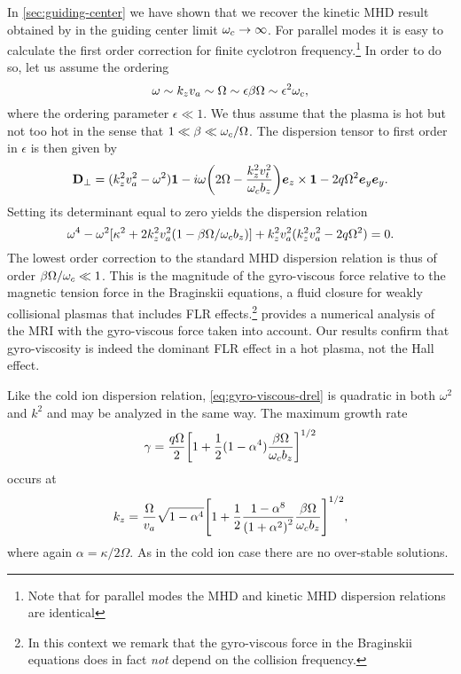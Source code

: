 \documentclass[aps,pre,notitlepage,amsmath,amssymb,amsfonts,nobibnotes,nofootinbib]{revtex4-1}
\begin{document}
In \cref{sec:guiding-center} we have shown that we recover the kinetic MHD
result obtained by \citet{Quataert2002} in the guiding center limit
$\omega_c\to\infty$. For parallel modes it is easy to calculate the first order
correction for finite cyclotron frequency.\footnote{Note that for parallel
  modes the MHD and kinetic MHD dispersion relations are identical} In order
to do so, let us assume the ordering
\begin{equation}
  \label{eq:ordering}
  \omega\sim k_z\va\sim\Omega\sim\epsilon\beta\Omega
  \sim\epsilon^2\omc,
\end{equation}
where the ordering parameter $\epsilon\ll1$. We thus assume that the plasma is
hot but not too hot in the sense that $1\ll\beta\ll\omega_c/\Omega$. The
dispersion tensor to first order in $\epsilon$ is then given by
\begin{equation}
  \label{eq:gyro-viscous-drel}
  \mathbf{D}_\perp = (k_z^2\va^2 - \omega^2)\mathbf{1} - i\omega\left(
    2\Omega - \frac{k_z^2\vt^2}{\omc b_z}
  \right)\ez\times\mathbf{1} - 2q\Omega^2\ey\ey.
\end{equation}
Setting its determinant equal to zero yields the dispersion relation
\begin{equation}
  \omega^4
  - \omega^2[\kappa^2 + 2k_z^2\va^2\left(1 - \beta\Omega/\omc b_z\right)]
  + k_z^2\va^2(k_z^2\va^2 - 2q\Omega^2) = 0.
\end{equation}
The lowest order correction to the standard MHD dispersion relation is thus of
order $\beta\Omega/\omega_c\ll{}1$. This is the magnitude of the gyro-viscous
force relative to the magnetic tension force in the Braginskii equations, a
fluid closure for weakly collisional plasmas that includes FLR
effects.\footnote{In this context we remark that the gyro-viscous force in the
  Braginskii equations does in fact \emph{not} depend on the collision
  frequency.} \citet{Ferraro2007} provides a numerical analysis of the MRI
with the gyro-viscous force taken into account. Our results confirm that
gyro-viscosity is indeed the dominant FLR effect in a hot plasma, not the Hall
effect.

Like the cold ion dispersion relation, \cref{eq:gyro-viscous-drel} is
quadratic in both $\omega^2$ and $k^2$ and may be analyzed in the same way.
The maximum growth rate
\begin{equation}
  \label{eq:maximum-growth-rate}
  \gamma = \frac{q\Omega}{2}{\left[
    1 + \frac{1}{2}(1-\alpha^4)\frac{\beta\Omega}{\omc b_z}
  \right]}^{1/2}
\end{equation}
occurs at
\begin{equation}
  \label{eq:optimal-wave-number}
  k_z = \frac{\Omega}{\va}\sqrt{1-\alpha^4}{\left[
    1 + \frac{1}{2}\frac{1-\alpha^8}{{(1+\alpha^2)}^2}
    \frac{\beta\Omega}{\omc b_z}
  \right]}^{1/2},
\end{equation}
where again $\alpha=\kappa/2\Omega$. As in the cold ion case there are no
over-stable solutions. 
\end{document}
